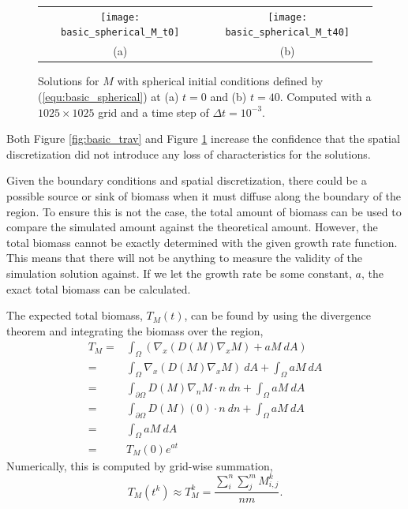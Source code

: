   \begin{figure}
    \centering
    \begin{tabular}{c c}
      \texttt{[image: basic\_spherical\_M\_t0]} & 
      \texttt{[image: basic\_spherical\_M\_t40]} \\
      (a) & (b)
    \end{tabular}
    \caption{Solutions for $M$ with spherical initial conditions defined by (\ref{equ:basic_spherical}) at (a) $t = 0$ and (b) $t = 40$. Computed with a $1025 \times 1025$ grid and a time step of $\Delta t = 10^{-3}$.}
    \label{fig:basic_spherical}
  \end{figure}
  
  Both Figure \ref{fig:basic_trav} and Figure \ref{fig:basic_spherical} increase the confidence that the spatial discretization did not introduce any loss of characteristics for the solutions.
    


  Given the boundary conditions and spatial discretization, there could be a possible source or sink of biomass when it must diffuse along the boundary of the region.
  To ensure this is not the case, the total amount of biomass can be used to compare the simulated amount against the theoretical amount. 
  However, the total biomass cannot be exactly determined with the given growth rate function.
  This means that there will not be anything to measure the validity of the simulation solution against.
  If we let the growth rate be some constant, $a$, the exact total biomass can be calculated.

  The expected total biomass, $T_M(t)$, can be found by using the divergence theorem and integrating the biomass over the region,
  \begin{equation} \label{equ:total_biomass}
  \begin{aligned}
    T_M = & \int_{\Omega} \left(  \nabla_x (D(M) \nabla_x M) + aM \ dA \right) \\
    = & \int_{\Omega} \nabla_x (D(M) \nabla_x M) \ dA + \int_{\Omega} aM \ dA \\
    = & \int_{\partial \Omega} D(M) \nabla_n M \cdot n \ dn + \int_{\Omega} aM \ dA \\
    = & \int_{\partial \Omega} D(M) (0) \cdot n \ dn + \int_{\Omega} aM \ dA \\
    = & \int_{\Omega} aM \ dA\\
    = & T_M(0) e^{at}
  \end{aligned}
  \end{equation}
  Numerically, this is computed by grid-wise summation,
  \begin{equation}
    T_{M}(t^k) \approx T_{M}^{k} = \frac{ \sum^n_i \sum^m_j M^{k}_{i,j} }{nm}.
  \end{equation}

